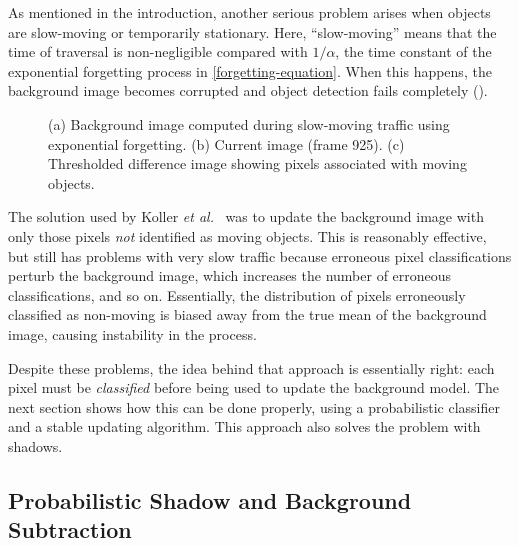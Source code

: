 As mentioned in the introduction, another serious problem arises when
objects are slow-moving or temporarily stationary. Here, ``slow-moving''
means that the time of
traversal is non-negligible compared with $1/\alpha$,
the time constant of the exponential forgetting process in
\eqref{forgetting-equation}. When this happens,
the background image becomes corrupted and object detection fails
completely ().

\begin{figure}[t]
\caption{(a) Background image computed during slow-moving traffic
using exponential forgetting. (b) Current image (frame 925). (c) Thresholded
difference image showing pixels associated with moving objects.}
\label{slow-traffic-figure}
\end{figure}

The solution used by Koller {\em et al.}~
was to update the background image with only those pixels
{\em not} identified as moving objects. This is reasonably effective,
but still has problems with very slow traffic because erroneous
pixel classifications perturb the background image, which increases
the number of erroneous classifications, and so on. Essentially, the
distribution of pixels erroneously classified as non-moving is biased
away from the true mean of the background image, causing
instability in the process.

Despite these problems, the idea behind that approach is
essentially right: each pixel must be {\em classified} before being
used to update the background model. The next section shows how this
can be done properly, using a probabilistic classifier and a stable
updating algorithm. This approach also solves the problem with shadows.



\subsection{Probabilistic Shadow and Background Subtraction}
\label{shadow-and-background-subtraction-section}
\label{pixel-model-section}


